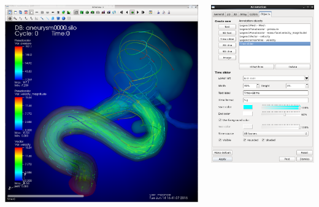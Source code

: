 \begin{frame}
\begin{columns}
\begin{column}{5.5cm}
	\centering
	\vspace{-2mm}
	\includegraphics[width=.855\columnwidth]{figs/visit-pract/VisIt_timeSlider}
\end{column}
\begin{column}{4.5cm}
        \includegraphics[width=\columnwidth]{figs/visit-guis/visit_annot-objects}

\end{column}
\end{columns}
\end{frame}

